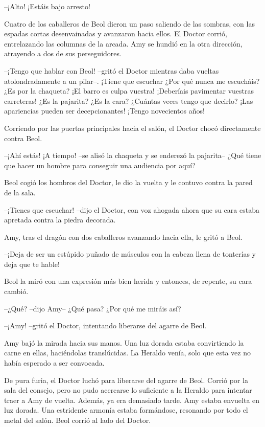 {--¡Alto! ¡Estáis bajo arresto!}

{Cuatro de los caballeros de Beol dieron un paso saliendo de las
	sombras, con las espadas cortas desenvainadas y avanzaron hacia ellos.
	El Doctor corrió, entrelazando las columnas de la arcada. Amy se hundió
en la otra dirección, atrayendo a dos de sus perseguidores.}

{--¡Tengo que hablar con Beol! --gritó el Doctor mientras daba vueltas
	atolondradamente a un pilar--. ¡Tiene que escuchar ¿Por qué nunca me
	escucháis? ¿Es por la chaqueta? ¡El barro es culpa vuestra! ¡Deberíais
	pavimentar vuestras carreteras! ¿Es la pajarita? ¿Es la cara? ¿Cuántas
	veces tengo que decirlo? ¡Las apariencias pueden ser decepcionantes!
¡Tengo novecientos años!}

{Corriendo por las puertas principales hacia el salón, el Doctor chocó
directamente contra Beol.}

{--¡Ahí estás! ¡A tiempo! --se alisó la chaqueta y se enderezó la
	pajarita-- ¿Qué tiene que hacer un hombre para conseguir una audiencia
por aquí?}

{Beol cogió los hombros del Doctor, le dio la vuelta y le contuvo contra
la pared de la sala.}

{--¡Tienes que escuchar! --dijo el Doctor, con voz ahogada ahora que
su cara estaba apretada contra la piedra decorada.}

{Amy, tras el dragón con dos caballeros avanzando hacia ella, le gritó a
Beol.}

{--¡Deja de ser un estúpido puñado de músculos con la cabeza llena de
tonterías y deja que te hable!}

{Beol la miró con una expresión más bien herida y entonces, de repente,
su cara cambió.}

{--¿Qué? --dijo Amy-- ¿Qué pasa? ¿Por qué me miráis así?}

{--¡Amy! --gritó el Doctor, intentando liberarse del agarre de Beol.}

{Amy bajó la mirada hacia sus manos. Una luz dorada estaba convirtiendo
	la carne en ellas, haciéndolas translúcidas. La Heraldo venía, solo que
esta vez no había esperado a ser convocada.}

{De pura furia, el Doctor luchó para liberarse del agarre de Beol.
	Corrió por la sala del consejo, pero no pudo acercarse lo suficiente a
	la Heraldo para intentar traer a Amy de vuelta. Además, ya era demasiado
	tarde. Amy estaba envuelta en luz dorada. Una estridente armonía estaba
	formándose, resonando por todo el metal del salón. Beol corrió al lado
del Doctor.}

